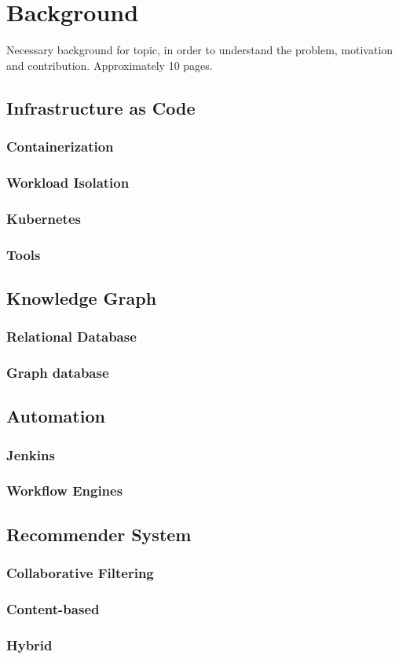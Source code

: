 \chapter{Background}
Necessary background for topic, in order to understand the problem, motivation and contribution. Approximately 10 pages.

\section{Infrastructure as Code}
\subsection{Containerization}
\subsection{Workload Isolation}
\subsection{Kubernetes} 
\subsection{Tools}

\section{Knowledge Graph}
\subsection{Relational Database}
\subsection{Graph database}

\section{Automation}
\subsection{Jenkins}
\subsection{Workflow Engines}

\section{Recommender System}
\subsection{Collaborative Filtering}
\subsection{Content-based}
\subsection{Hybrid}

